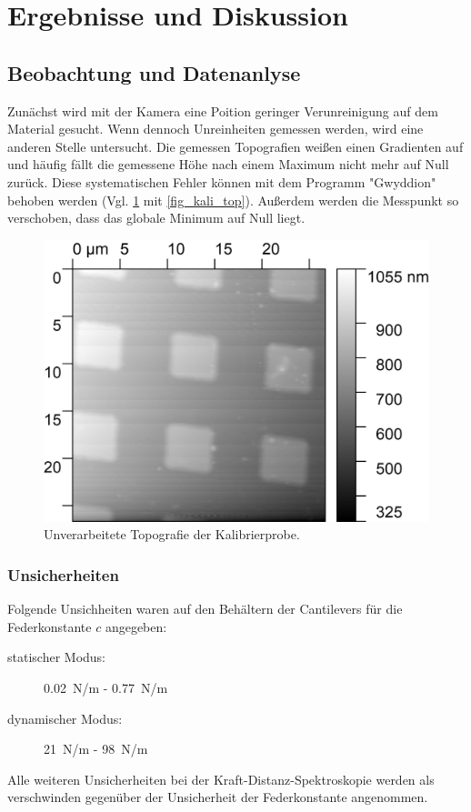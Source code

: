 \documentclass[
	a4paper,
	12pt,
	pagesize,
	ngerman
]{scrartcl}
\begin{document}
	\section{Ergebnisse und Diskussion}


	\subsection{Beobachtung und Datenanlyse}

	Zunächst wird mit der Kamera eine Poition geringer Verunreinigung auf dem Material gesucht.
	Wenn dennoch Unreinheiten gemessen werden, wird eine anderen Stelle untersucht.
	Die gemessen Topografien weißen einen Gradienten auf und häufig fällt die gemessene Höhe nach einem Maximum nicht mehr auf Null zurück. %
	Diese systematischen Fehler können mit dem Programm "Gwyddion" behoben werden (Vgl. \cref{fig_kali_raw} mit \cref{fig_kali_top}).
	Außerdem werden die Messpunkt so verschoben, dass das globale Minimum auf Null liegt.

	\begin{figure}[H]
			\includegraphics[width=.6\linewidth]{images/Kali/raw}
			\caption{Unverarbeitete Topografie der Kalibrierprobe.}
			\label{fig_kali_raw}
	\end{figure}

\subsubsection{Unsicherheiten}
	Folgende Unsichheiten waren auf den Behältern der Cantilevers für die Federkonstante $c$ angegeben:
	\begin{description}
		\item[statischer Modus:] \SI{0.02}{N/m} - \SI{0.77}{N/m} %
		\item[dynamischer Modus:] \SI{21}{N/m} - \SI{98}{N/m} %
	\end{description}
	Alle weiteren Unsicherheiten bei der Kraft-Distanz-Spektroskopie werden als verschwinden gegenüber der Unsicherheit der Federkonstante angenommen.
\end{document}
